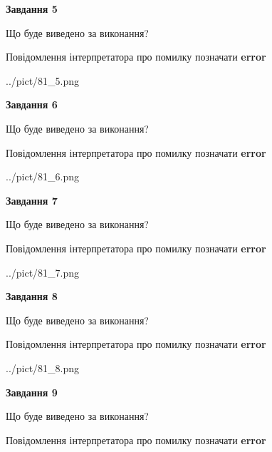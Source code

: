 \documentclass[11pt, ukrainian]{article}
\begin{document}
{\begin {large}
{\begin {center}\textbf{Завдання 5}\end {center}}\par
Що буде виведено за виконання? \par
Повідомлення інтерпретатора про помилку позначати \textbf{error}

\begin{center}
	{../pict/81_5.png}
\end{center}
\newpage

{\begin {center}\textbf{Завдання 6}\end {center}}\par
Що буде виведено за виконання? \par
Повідомлення інтерпретатора про помилку позначати \textbf{error}

\begin{center}
	{../pict/81_6.png}
\end{center}
\newpage

{\begin {center}\textbf{Завдання 7}\end {center}}\par
Що буде виведено за виконання? \par
Повідомлення інтерпретатора про помилку позначати \textbf{error}

\begin{center}
	{../pict/81_7.png}
\end{center}
\newpage

{\begin {center}\textbf{Завдання 8}\end {center}}\par
Що буде виведено за виконання? \par
Повідомлення інтерпретатора про помилку позначати \textbf{error}

\begin{center}
	{../pict/81_8.png}
\end{center}
\newpage

{\begin {center}\textbf{Завдання 9}\end {center}}\par
Що буде виведено за виконання? \par
Повідомлення інтерпретатора про помилку позначати \textbf{error}


\end{large}}
\end{document}
